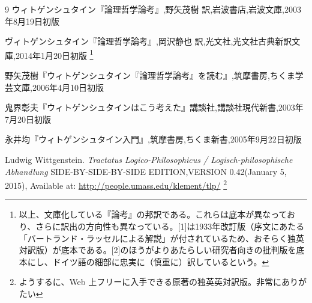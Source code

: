 \documentclass[11pt,a4paper]{jsarticle}
\begin{document}



\begin{thebibliography}
{9}
\bibitem{}ウィトゲンシュタイン『論理哲学論考』,野矢茂樹 訳,岩波書店,岩波文庫,2003年8月19日初版

\bibitem{}ヴィトゲンシュタイン『論理哲学論考』,岡沢静也 訳,光文社,光文社古典新訳文庫,2014年1月20日初版
\footnote{以上、文庫化している『論考』の邦訳である。これらは底本が異なっており、さらに訳出の方向性も異なっている。[1]は1933年改訂版（序文にあたる「バートランド・ラッセルによる解説」が付されているため、おそらく独英対訳版）が底本である。[2]のほうがよりあたらしい研究者向きの批判版を底本にし、ドイツ語の細部に忠実に（慎重に）訳しているという。}

\bibitem{}野矢茂樹『ウィトゲンシュタイン『論理哲学論考』を読む』,筑摩書房,ちくま学芸文庫,2006年4月10日初版

\bibitem{}鬼界彰夫『ウィトゲンシュタインはこう考えた』講談社,講談社現代新書,2003年7月20日初版

\bibitem{}永井均『ウィトゲンシュタイン入門』,筑摩書房,ちくま新書,2005年9月22日初版

\bibitem{}Ludwig Wittgenstein. {\it Tractatus Logico-Philosophicus / Logisch-philosophische Abhandlung }SIDE-BY-SIDE-BY-SIDE EDITION,VERSION 0.42(January 5, 2015), Available at: \url{http://people.umass.edu/klement/tlp/}
\footnote{ようするに、Web 上フリーに入手できる原著の独英英対訳版。非常にありがたい}


\end{thebibliography}
\end{document}
